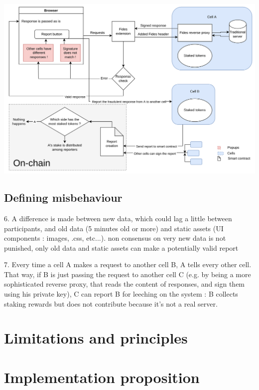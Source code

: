 \documentclass{paper}
\begin{document}
\includegraphics[width=\textwidth]{fides_flowchart.png}\par\vspace{1cm}

\subsection{Defining misbehaviour}
6. A difference is made between new data, which could lag a little between participants, and old data (5 minutes old or more) and static assets (UI components : images, .css, etc...). non consensus on very new data is not punished, only old data and static assets can make a potentially valid report

7. Every time a cell A makes a request to another cell B, A tells every other cell. That way, if B is just passing the request to another cell C (e.g. by being a more sophisticated reverse proxy, that reads the content of responses, and sign them using his private key), C can report B for leeching on the system : B collects staking rewards but does not contribute because it's not a real server.

\section{Limitations and principles}

\section{Implementation proposition}
\end{document}
